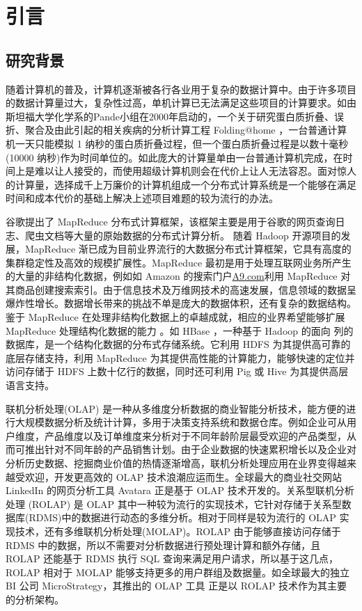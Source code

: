 \chapter{引言}

\section{研究背景}
随着计算机的普及，计算机逐渐被各行各业用于复杂的数据计算中。由于许多项目的数据计算量过大，复杂性过高，单机计算已无法满足这些项目的计算要求。如由斯坦福大学化学系的Pande小组在2000年启动的，一个关于研究蛋白质折叠、误折、聚合及由此引起的相关疾病的分析计算工程 Folding@home \cite{folding}，一台普通计算机一天只能模拟 1 纳秒的蛋白质折叠过程，但一个蛋白质折叠过程是以数十毫秒(10000 纳秒)作为时间单位的。如此庞大的计算量单由一台普通计算机完成，在时间上是难以让人接受的，而使用超级计算机则会在代价上让人无法容忍。面对惊人的计算量，选择成千上万廉价的计算机组成一个分布式计算系统是一个能够在满足时间和成本代价的基础上解决上述项目难题的较为流行的办法。

谷歌提出了 MapReduce \cite{dean2008mapreduce}分布式计算框架，该框架主要是用于谷歌的网页查询日志、爬虫文档等大量的原始数据的分布式计算分析。 随着 Hadoop \cite{hadoop}开源项目的发展，MapReduce 渐已成为目前业界流行的大数据分布式计算框架，它具有高度的集群稳定性及高效的规模扩展性。MapReduce 最初是用于处理互联网业务所产生的大量的非结构化数据，例如如 Amazon 的搜索门户\url{A9.com}利用 MapReduce 对其商品创建搜索索引。由于信息技术及万维网技术的高速发展，信息领域的数据呈爆炸性增长。数据增长带来的挑战不单是庞大的数据体积，还有复杂的数据结构。鉴于 MapReduce 在处理非结构化数据上的卓越成就，相应的业界希望能够扩展 MapReduce 处理结构化数据的能力 \cite{hbase} \cite{abouzeid2009hadoopdb} \cite{buck2011scihadoop} \cite{pig} \cite{hive}。如 HBase \cite{hbase}，一种基于 Hadoop 的面向
列的数据库，是一个结构化数据的分布式存储系统。它利用 HDFS 为其提供高可靠的底层存储支持，利用 MapReduce 为其提供高性能的计算能力，能够快速的定位并访问存储于 HDFS 上数十亿行的数据，同时还可利用 Pig \cite{pig} 或 Hive \cite{hive} 为其提供高层语言支持。

联机分析处理(OLAP) \cite{chaudhuri1997overview} 是一种从多维度分析数据的商业智能分析技术，能方便的进行大规模数据分析及统计计算，多用于决策支持系统和数据仓库。例如企业可从用户维度，产品维度以及订单维度来分析对于不同年龄阶层最受欢迎的产品类型，从而可推出针对不同年龄的产品销售计划。由于企业数据的快速累积增长以及企业对分析历史数据、挖掘商业价值的热情逐渐增高，联机分析处理应用在业界变得越来越受欢迎，开发更高效的 OLAP 技术浪潮应运而生。全球最大的商业社交网站 LinkedIn 的网页分析工具 Avatara \cite{wu2012avatara} 正是基于 OLAP 技术开发的。关系型联机分析处理 (ROLAP) \cite{pedersen2001multidimensional}是 OLAP 其中一种较为流行的实现技术，它针对存储于关系型数据库(RDMS)中的数据进行动态的多维分析。相对于同样是较为流行的 OLAP 实现技术，还有多维联机分析处理(MOLAP)。ROLAP 由于能够直接访问存储于 RDMS 中的数据，所以不需要对分析数据进行预处理计算和额外存储，且 ROLAP 还能基于 RDMS 执行 SQL 查询来满足用户请求，所以基于这几点，ROLAP 相对于 MOLAP 能够支持更多的用户群组及数据量。如全球最大的独立 BI 公司 MicroStrategy，其推出的 OLAP 工具 \cite{msolapservice} 正是以 ROLAP 技术作为其主要的分析架构。


